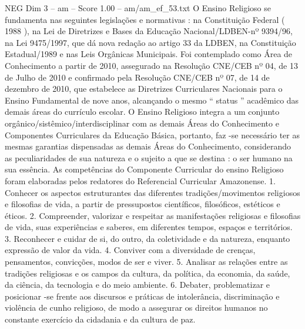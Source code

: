 \begin{textsample}{NEG Dim 3 – am – Score 1.00 – am/am\_ef\_53.txt}  \label{ex:f3_neg_258}
O Ensino Religioso se fundamenta nas seguintes legislações e normativas : na Constituição Federal ( 1988 ), na Lei de Diretrizes e Bases da Educação Nacional/LDBEN-nº 9394/96, na Lei 9475/1997, que dá nova redação ao artigo 33 da LDBEN, na Constituição Estadual/1989 e nas Leis Orgânicas Municipais.
Foi contemplado como Área de Conhecimento a partir de 2010, assegurado na Resolução CNE/CEB nº 04, de 13 de Julho de 2010 e confirmado pela Resolução CNE/CEB nº 07, de 14 de dezembro de 2010, que estabelece as Diretrizes Curriculares Nacionais para o Ensino Fundamental de nove anos, alcançando o mesmo “ status ” acadêmico das demais áreas do currículo escolar.
O Ensino Religioso integra a um conjunto orgânico/sistêmico/interdisciplinar com as demais Áreas do Conhecimento e Componentes Curriculares da Educação Básica, portanto, faz -se necessário ter as mesmas garantias dispensadas as demais Áreas do Conhecimento, considerando as peculiaridades de sua natureza e o sujeito a que se destina : o ser humano na sua essência.
As competências do Componente Curricular do ensino Religioso foram elaboradas pelos redatores do Referencial Curricular Amazonense. 1.
Conhecer os aspectos estruturantes das diferentes tradições/movimentos religiosos e filosofias de vida, a partir de pressupostos científicos, filosóficos, estéticos e éticos. 2.
Compreender, valorizar e respeitar as manifestações religiosas e filosofias de vida, suas experiências e saberes, em diferentes tempos, espaços e territórios. 3.
Reconhecer e cuidar de si, do outro, da coletividade e da natureza, enquanto expressão de valor da vida. 4.
Conviver com a diversidade de crenças, pensamentos, convicções, modos de ser e viver. 5.
Analisar as relações entre as tradições religiosas e os campos da cultura, da política, da economia, da saúde, da ciência, da tecnologia e do meio ambiente. 6.
Debater, problematizar e posicionar -se frente aos discursos e práticas de intolerância, discriminação e violência de cunho religioso, de modo a assegurar os direitos humanos no constante exercício da cidadania e da cultura de paz.

\end{textsample}
